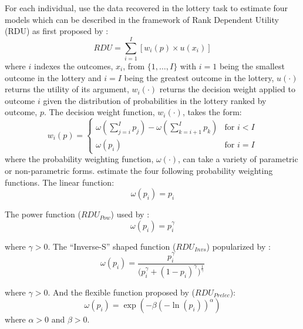 \documentclass[11pt,a4paper]{report}
\begin{document}
For each individual, \textcite{Harrison2016} use the data recovered in the lottery task to estimate four models which can be described in the framework of Rank Dependent Utility (RDU) as first proposed by \textcite{Quiggin1982}:
\begin{equation}
	\label{eq4:RDU}
	RDU = \sum_{i=1}^{I} \left[ w_i(p) \times u(x_i) \right]
\end{equation}
\noindent where $i$ indexes the outcomes, $x_i$, from $\{1,\ldots,I\}$ with $i=1$ being the smallest outcome in the lottery and $i=I$ being the greatest outcome in the lottery, $u(\cdot)$ returns the utility of its argument, $w_i(\cdot)$ returns the decision weight applied to outcome $i$ given the distribution of probabilities in the lottery ranked by outcome, $p$.
The decision weight function, $w_i(\cdot)$, takes the form:
\begin{equation}
	\label{eq4:dweight}
	w_i(p) =
	\begin{cases}
		\omega\left(\displaystyle\sum_{j=i}^I p_j\right) - \omega\left(\displaystyle\sum_{k=i+1}^I p_k\right) & \text{for } i<I \\
		\omega(p_i) & \text{for } i = I
	\end{cases}
\end{equation}
\noindent where the probability weighting function, $\omega(\cdot)$, can take a variety of parametric or non-parametric forms.
\textcite{Harrison2016} estimate the four following probability weighting functions. The linear function:
\begin{equation}
	\label{eq4:pw:eut}
	\omega(p_i) = p_i
\end{equation}

\noindent The power function ($\mathit{RDU_{Pow}}$) used by \textcite{Quiggin1982}:
\begin{equation}
	\label{eq4:pw:pow}
	\omega(p_i)=p_i^\gamma
\end{equation}

\noindent where $\gamma > 0$. The \enquote{Inverse-S} shaped function ($\mathit{RDU_{Invs}}$) popularized by \textcite{Tversky1992}:
\begin{equation}
	\label{eq4:pw:inv}
	\omega(p_i) = \frac{p_i^\gamma}{\biggl(p_i^\gamma + {(1-p_i)}^\gamma\biggr)^{ \frac{1}{\gamma} } }
\end{equation}

\noindent where $\gamma > 0$. And the flexible function proposed by \textcite{Prelec1998} ($\mathit{RDU_{Prelec}}$):
\begin{equation}
	\label{eq4:pw:pre}
	\omega(p_i)=\exp(-\beta(-\ln(p_i))^\alpha)
\end{equation}
\noindent where $\alpha > 0$ and $\beta > 0$.
\end{document}
